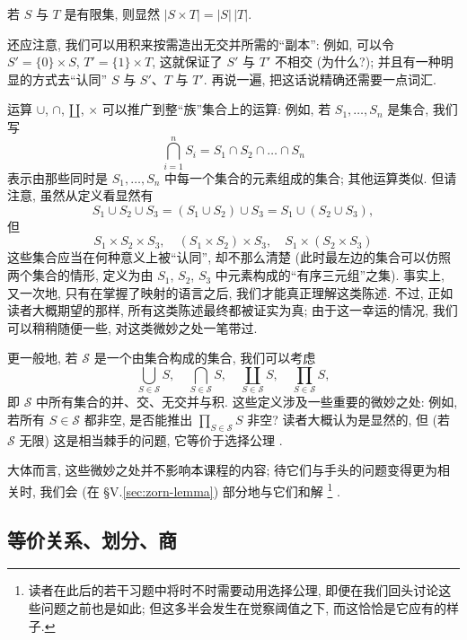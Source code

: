 若 $S$ 与 $T$ 是有限集, 则显然 $|S \times T| = |S|\,|T|$.

还应注意, 我们可以用积来按需造出无交并所需的``副本'': 例如, 可以令 $S' = \{0\} \times S$, $T' = \{1\} \times T$, 这就保证了 $S'$ 与 $T'$ 不相交 (为什么?); 并且有一种明显的方式去``认同'' $S$ 与 $S'$、$T$ 与 $T'$. 再说一遍, 把这话说精确还需要一点词汇.

运算 $\cup$, $\cap$, $\amalg$, $\times$ 可以推广到整``族''集合上的运算: 例如, 若 $S_1, \ldots, S_n$ 是集合, 我们写
\[
\bigcap_{i=1}^{n} S_i = S_1 \cap S_2 \cap \dots \cap S_n
\]
表示由那些同时是 $S_1, \ldots, S_n$ 中每一个集合的元素组成的集合; 其他运算类似. 但请注意, 虽然从定义看显然有
\[
S_1 \cup S_2 \cup S_3 = (S_1 \cup S_2) \cup S_3 = S_1 \cup (S_2 \cup S_3),
\]
但
\[
S_1 \times S_2 \times S_3, \quad (S_1 \times S_2) \times S_3, \quad S_1 \times (S_2 \times S_3)
\]
这些集合应当在何种意义上被``认同'', 却不那么清楚 (此时最左边的集合可以仿照两个集合的情形, 定义为由 $S_1$, $S_2$, $S_3$ 中元素构成的``有序三元组''之集). 事实上, 又一次地, 只有在掌握了映射的语言之后, 我们才能真正理解这类陈述. 不过, 正如读者大概期望的那样, 所有这类陈述最终都被证实为真; 由于这一幸运的情况, 我们可以稍稍随便一些, 对这类微妙之处一笔带过.

更一般地, 若 $\mathcal{S}$ 是一个由集合构成的集合, 我们可以考虑
\[
\bigcup_{S \in \mathcal{S}} S, \quad \bigcap_{S \in \mathcal{S}} S, \quad \coprod_{S \in \mathcal{S}} S, \quad \prod_{S \in \mathcal{S}} S,
\]
即 $\mathcal{S}$ 中所有集合的并、交、无交并与积. 这些定义涉及一些重要的微妙之处: 例如, 若所有 $S \in \mathcal{S}$ 都非空, 是否能推出 $\prod_{S \in \mathcal{S}} S$ 非空? 读者大概认为是显然的, 但 (若 $\mathcal{S}$ 无限) 这是相当棘手的问题, 它等价于选择公理%
.

大体而言, 这些微妙之处并不影响本课程的内容; 待它们与手头的问题变得更为相关时, 我们会 (在 \S V.\ref{sec:zorn-lemma}) 部分地与它们和解%
\footnote{读者在此后的若干习题中将时不时需要动用选择公理, 即便在我们回头讨论这些问题之前也是如此; 但这多半会发生在觉察阈值之下, 而这恰恰是它应有的样子.}%
.

\subsection{等价关系、划分、商}
\label{subsec:equivalence-relations}

